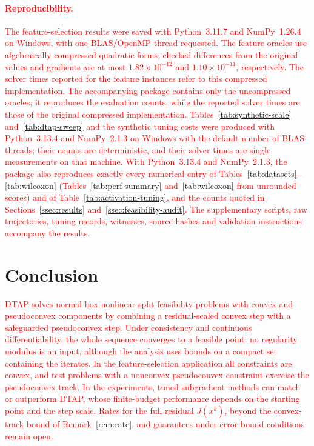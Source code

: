\documentclass[]{interact}
\theoremstyle{plain}
\theoremstyle{definition}
\theoremstyle{remark}
\begin{document}
\paragraph*{\textcolor{red}{Reproducibility.}}
\leavevmode\textcolor{red}{The feature-selection results were saved with Python~3.11.7 and NumPy~1.26.4
on Windows, with one BLAS/OpenMP thread requested. The feature oracles use algebraically
compressed quadratic forms; checked differences from the original
values and gradients are at most $1.82\times10^{-12}$ and
$1.10\times10^{-11}$, respectively. The solver times reported for the feature instances refer
to this compressed implementation. The accompanying package contains only the uncompressed
oracles; it reproduces the evaluation counts, while the reported solver times are those of
the original compressed implementation. Tables~\ref{tab:synthetic-scale}
and~\ref{tab:dtap-sweep} and the synthetic tuning costs were produced with
Python~3.13.4 and NumPy~2.1.3 on Windows with the default number of BLAS
threads; their counts are deterministic, and their solver times are single
measurements on that machine. With Python~3.13.4 and NumPy~2.1.3, the package also
reproduces exactly every numerical entry of Tables~\ref{tab:datasets}--\ref{tab:wilcoxon}
(Tables~\ref{tab:perf-summary} and~\ref{tab:wilcoxon} from unrounded scores) and of
Table~\ref{tab:activation-tuning}, and the counts quoted in Sections~\ref{ssec:results}
and~\ref{ssec:feasibility-audit}.
The supplementary scripts, raw trajectories, tuning records, witnesses,
source hashes and validation instructions accompany the results.}

\section{Conclusion}\label{sec:conclusion}
\leavevmode\textcolor{red}{DTAP solves normal-box nonlinear split feasibility problems with convex and pseudoconvex components by combining a residual-scaled convex step with a safeguarded pseudoconvex step. Under consistency and continuous differentiability, the whole sequence converges to a feasible point; no regularity modulus is an input, although the analysis uses bounds on a compact set containing the iterates. In the feature-selection application all constraints are convex, and test problems with a nonconvex pseudoconvex constraint exercise the pseudoconvex track. In the experiments, tuned subgradient methods can match or outperform DTAP, whose finite-budget performance depends on the starting point and the step scale. Rates for the full residual $J(x^k)$, beyond the convex-track bound of Remark~\ref{rem:rate}, and guarantees under error-bound conditions remain open.}
\end{document}
